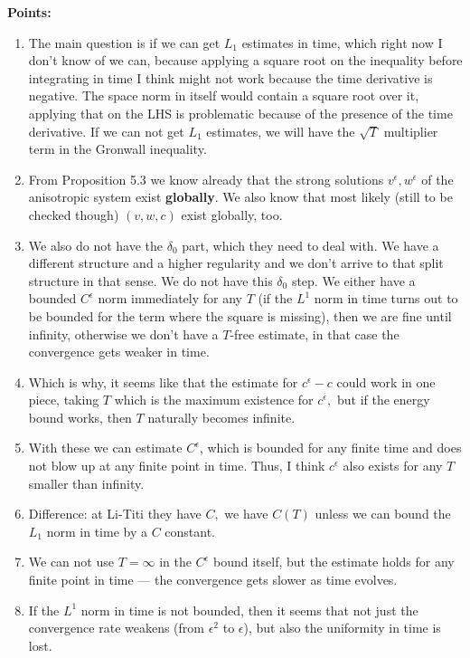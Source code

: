 \documentclass[11pt]{article}
\begin{document}
\textbf{Points:}
\begin{enumerate}
  \item The main question is if we can get $L_1$ estimates in time, which right now I don't know of we can, because applying a square root on the inequality before integrating in time I think might not work because the time derivative is negative. The space norm in itself would contain a square root over it, applying that on the LHS is problematic because of the presence of the time derivative. If we can not get $L_1$ estimates, we will have the $\sqrt{T}$ multiplier term in the Gronwall inequality.
  \item From Proposition 5.3 we know already that the strong solutions $v^\epsilon, w^\epsilon$ of the anisotropic system exist \textbf{globally}. We also know that most likely (still to be checked though) $(v,w,c)$ exist globally, too.
  \item We also do not have the $\delta_0$ part, which they need to deal with. We have a different structure and a higher regularity and we don't arrive to that split structure in that sense. We do not have this $\delta_0$ step. We either have a bounded $C^\epsilon$ norm immediately for any $T$ (if the $L^1$ norm in time turns out to be bounded for the term where the square is missing), then we are fine until infinity, otherwise we don't have a $T$-free estimate, in that case the convergence gets weaker in time.
  \item Which is why, it seems like that the estimate for $c^\epsilon - c$ could work in one piece, taking $T$ which is the maximum existence for $c^\epsilon,$ but if the energy bound works, then $T$ naturally becomes infinite.
  \item With these we can estimate $C^\epsilon$, which is bounded for any finite time and does not blow up at any finite point in time. Thus, I think $c^\epsilon$ also exists for any $T$ smaller than infinity.
  \item Difference: at Li-Titi they have $C,$ we have $C(T)$ unless we can bound the $L_1$ norm in time by a $C$ constant.
  \item We can not use $T=\infty$ in the $C^\epsilon$ bound itself, but the estimate holds for any finite point in time --- the convergence gets slower as time evolves.
  \item If the $L^1$ norm in time is not bounded, then it seems that not just the convergence rate weakens (from $\epsilon^2$ to $\epsilon$), but also the uniformity in time is lost.
\end{enumerate}
     
\end{document}
